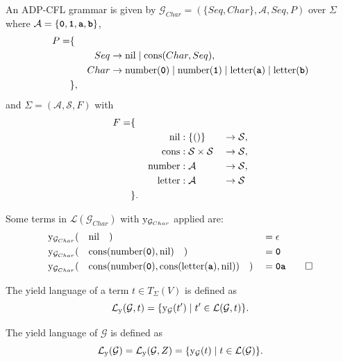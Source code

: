 \documentclass[
    a4paper,
    12pt,
    twoside,
    BCOR=12mm,
    parskip=half,
    chapterprefix,
    numbers=noenddot,
    bibliography=totoc
]{scrbook}
\begin{document}
\begin{example}
	\label{ex:adp_cfl_chars}
	An ADP-CFL grammar is given by $\mathcal{G}_{Char} = (\{Seq,Char\},\mathcal{A},Seq,P)$ over $\Sigma$ where $\mathcal{A}=\{\ts{0},\ts{1},\ts{a},\ts{b}\}$,
	\begin{align*}
		P = &\{&&\\
			&&Seq &\to \op{nil} \mid \op{cons}(Char,Seq), \\
			&&Char &\to \op{number}(\ts{0}) \mid \op{number}(\ts{1}) \mid \op{letter}(\ts{a}) \mid \op{letter}(\ts{b})\\
		&\},&&
	\end{align*}
	and $\Sigma=(\mathcal{A},\mathcal{S},F)$ with
	\begin{align*}
		F = &\{&&&&\\
		&&\mathrm{nil} &: \{()\} &&\to \mathcal{S},\\
		&&\mathrm{cons} &: \mathcal{S} \times \mathcal{S} &&\to \mathcal{S},\\
		&&\mathrm{number} &: \mathcal{A} &&\to \mathcal{S},\\
		&&\mathrm{letter} &: \mathcal{A} &&\to \mathcal{S}\\
		&\}.&&&&
	\end{align*}
	
	Some terms in $\mathcal{L}(\mathcal{G}_{Char})$ with $\mathrm{y}_{\mathcal{G}_{Char}}$ applied are:
	\begin{align*}
		&\op{y}_{\mathcal{G}_{Char}}(\quad\op{nil} \quad) &&= \epsilon\\
		&\op{y}_{\mathcal{G}_{Char}}(\quad\op{cons}(\op{number}(\ts{0}),\op{nil})\quad) &&= \ts{0}\\
		&\op{y}_{\mathcal{G}_{Char}}(\quad\op{cons}(\op{number}(\ts{0}),\op{cons}(\op{letter}(\ts{a}),\op{nil}))\quad) &&= \ts{0a} \qedhere
	\end{align*}
\end{example}

The yield language of a term $t \in T_\Sigma(V)$ is defined as 
\begin{equation}
	\mathcal{L}_{\mathrm{y}}(\mathcal{G},t) = \{ \mathrm{y}_\mathcal{G}(t') \mid t' \in \mathcal{L}(\mathcal{G},t) \}.
\end{equation}

The yield language of $\mathcal{G}$ is defined as 
\begin{equation}
	\mathcal{L}_{\mathrm{y}}(\mathcal{G}) = \mathcal{L}_{\mathrm{y}}(\mathcal{G},Z) = \{ \mathrm{y}_\mathcal{G}(t) \mid t \in \mathcal{L}(\mathcal{G}) \}.
\end{equation}
\end{document}
